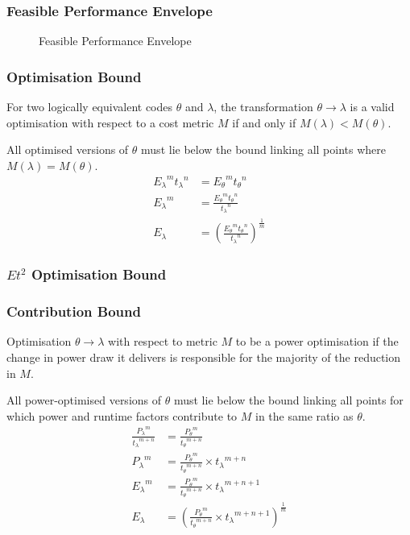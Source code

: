 \documentclass{beamer}
\begin{document}
  \begin{frame}
    \frametitle{Feasible Performance Envelope}
    \begin{figure}
    \centering
    
    \caption{Feasible Performance Envelope}
    \end{figure}
  \end{frame}


  \begin{frame}
    \frametitle{Optimisation Bound}
    \begin{definition}
    For two logically equivalent codes $\theta$ and $\lambda$, the transformation ${\theta \to \lambda}$ is a valid optimisation with respect to a cost metric $M$ if and only if ${M(\lambda) < M(\theta)}$. 
    \end{definition}
All optimised versions of $\theta$ must lie below the bound linking all points where ${M(\lambda) = M(\theta)}$.
\begin{align}
 {E_\lambda}^m{t_\lambda}^n &= {E_\theta}^m{t_\theta}^n \nonumber \\
 {E_\lambda}^m &= \frac{{E_\theta}^m{t_\theta}^n}{{t_\lambda}^n} \nonumber \\
  E_\lambda &= (\frac{{E_\theta}^m{t_\theta}^n}{{t_\lambda}^n})^\frac{1}{m}
\end{align}
  \end{frame}

  \begin{frame}
    \frametitle{$Et^2$ Optimisation Bound}
    \newcommand*{\OPTBOUND}{}%
    \begin{figure}
    \centering
    
    \end{figure}
  \end{frame}

  \begin{frame}
    \frametitle{Contribution Bound}
    \begin{definition}
      Optimisation $\theta \to \lambda$ with respect to metric $M$ to be a power optimisation if the change in power draw it delivers is responsible for the majority of the reduction in $M$. 
      \end{definition}
 All power-optimised versions of $\theta$ must lie below the bound linking all points for which power and runtime factors contribute to $M$ in the same ratio as $\theta$.
\begin{align}
\frac{{P_{\lambda}}^m}{{t_{\lambda}}^{m+n}} &= \frac{{P_{\theta}}^m}{{t_{\theta}}^{m+n}} \nonumber \\
 {P_{\lambda}}^m &= \frac{{P_{\theta}}^m}{{t_{\theta}}^{m+n}} \times {t_\lambda}^{m+n} \nonumber \\ 
 {E_{\lambda}}^m &= \frac{{P_{\theta}}^m}{{t_{\theta}}^{m+n}} \times {t_\lambda}^{m+n+1} \nonumber \\ 
  E_{\lambda} &= (\frac{{P_{\theta}}^m}{{t_{\theta}}^{m+n}} \times {t_\lambda}^{m+n+1})^{\frac{1}{m}} 
\end{align}
  \end{frame}
\end{document}
